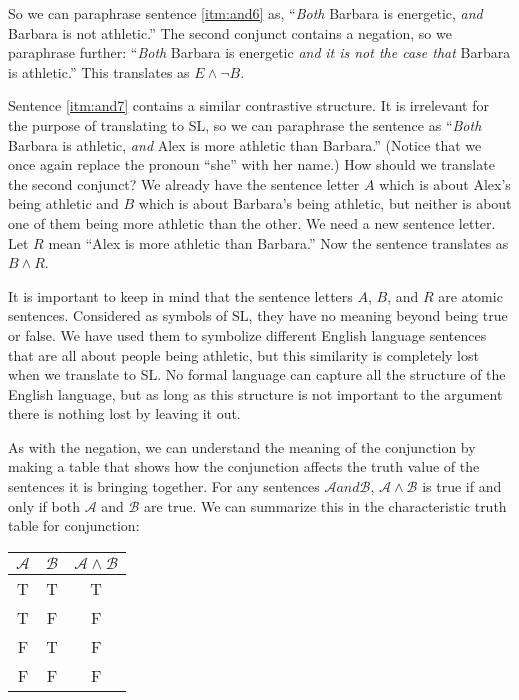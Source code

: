 So we can paraphrase sentence \ref{itm:and6} as, ``\emph{Both} Barbara is energetic, \emph{and} Barbara is not athletic.'' The second conjunct contains a negation, so we paraphrase further: ``\emph{Both} Barbara is energetic \emph{and} \emph{it is not the case that} Barbara is athletic.'' This translates as $E \land \lnot B$.

Sentence \ref{itm:and7} contains a similar contrastive structure. It is irrelevant for the purpose of translating to SL, so we can paraphrase the sentence as ``\emph{Both} Barbara is athletic, \emph{and} Alex is more athletic than Barbara.'' (Notice that we once again replace the pronoun ``she'' with her name.) How should we translate the second conjunct? We already have the sentence letter $A$ which is about Alex's being athletic and $B$ which is about Barbara's being athletic, but neither is about one of them being more athletic than the other. We need a new sentence letter. Let $R$ mean ``Alex is more athletic than Barbara.'' Now the sentence translates as $B \land R$.

It is important to keep in mind that the sentence letters $A$, $B$, and $R$ are atomic sentences. Considered as symbols of SL, they have no meaning beyond being true or false. We have used them to symbolize different English language sentences that are all about people being athletic, but this similarity is completely lost when we translate to SL. No formal language can capture all the structure of the English language, but as long as this structure is not important to the argument there is nothing lost by leaving it out.

As with the negation, we can understand the meaning of the conjunction by making a table that shows how the conjunction affects the truth value of the  sentences it is bringing together.
For any sentences $\mathcal{A} and \mathcal{B}$, $\mathcal{A} \land \mathcal{B}$ is true if and only if both $\mathcal{A}$ and $\mathcal{B}$ are true. We can summarize this in the {characteristic truth table} for conjunction:

\begin{table}
\begin{tabular}{c|c|c}
$\mathcal{A}$ & $\mathcal{B}$ & $\mathcal{A} \land \mathcal{B}$ \\
\hline
T & T & T \\
T & F & F \\
F & T & F \\
F & F & F \\
\end{tabular}
\end{table}

